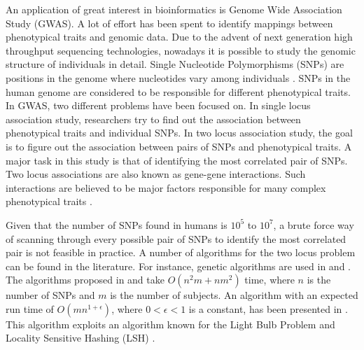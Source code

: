 \documentclass{article}
\theoremstyle{definition}
\theoremstyle{remark}
\begin{document}
An application of great interest in bioinformatics is Genome Wide Association Study (GWAS). A lot of effort has been spent to identify mappings between phenotypical traits and genomic data. Due to the advent of next generation high throughput sequencing technologies, nowadays it is possible to study the genomic structure of individuals in detail. Single Nucleotide Polymorphisms (SNPs) are  positions in the genome where nucleotides vary among individuals \cite{T07}. SNPs in the human genome are considered to be responsible for different phenotypical traits. In GWAS,  two different problems have been focused on. In single locus association study, researchers try to find out the association between phenotypical traits and individual SNPs. In two locus association study, the goal is to figure out the association between pairs of SNPs and phenotypical traits. A major task in this study is that of identifying the most correlated pair of SNPs. Two locus associations are also known as gene-gene interactions.
Such interactions are believed to be major factors responsible for many complex phenotypical traits \cite{SDNRCNHD07,CDDBDADLMDCJE05,JDLCMPMLYJBEJSTS98,H09,NMDPCGA99,JCSEBSAKLDPJW04}.

Given that the number of SNPs found in humans is $10^5$ to $10^7$, a brute force way of scanning through every possible pair of SNPs to identify the most correlated pair is not feasible in practice. A number of algorithms for the two locus problem can be found in the literature. For instance, genetic algorithms are used in \cite{NYH01} and \cite{YXKR10}. The algorithms proposed in  \cite{XSFW10} and \cite{XFW08} take $O(n^2m+nm^2)$ time, where $n$ is the number of SNPs and $m$ is the number of subjects. An algorithm with an expected run time of $O(mn^{1+\epsilon})$, where $0<\epsilon<1$ is a constant, has been presented in \cite{PBK11}. This algorithm exploits an algorithm known for the  Light Bulb Problem \cite{RSJ89} and Locality Sensitive Hashing (LSH) \cite{M02}.
\end{document}
